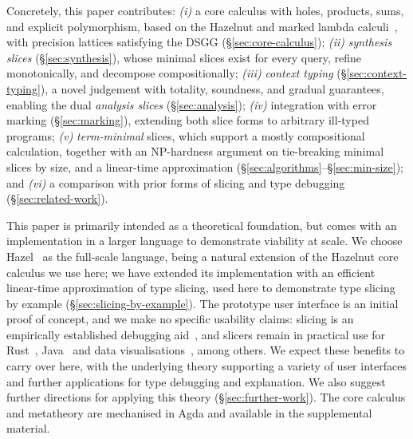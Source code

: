 Concretely, this paper contributes:
{\em (i)} a core calculus with holes, products, sums, and explicit polymorphism, based on the Hazelnut and marked lambda calculi~\cite{Hazelnut2017,Marking2024}, with precision lattices satisfying the DSGG (\S\ref{sec:core-calculus});
{\em (ii)} \textit{synthesis slices} (\S\ref{sec:synthesis}), whose minimal slices exist for every query, refine monotonically, and decompose compositionally;
{\em (iii)} \textit{context typing} (\S\ref{sec:context-typing}), a novel judgement with totality, soundness, and gradual guarantees, enabling the dual \textit{analysis slices} (\S\ref{sec:analysis});
{\em (iv)} integration with error marking (\S\ref{sec:marking}), extending both slice forms to arbitrary ill-typed programs;
{\em (v)} \textit{term-minimal} slices, which support a mostly compositional calculation, together with an NP-hardness argument on tie-breaking minimal slices by size, and a linear-time approximation (\S\ref{sec:algorithms}--\S\ref{sec:min-size});
and {\em (vi)} a comparison with prior forms of slicing and type debugging (\S\ref{sec:related-work}).

This paper is primarily intended as a theoretical foundation, but comes with an implementation in a larger language to demonstrate viability at scale. We choose Hazel~\cite{hazel-website} as the full-scale language, being a natural extension of the Hazelnut core calculus we use here; we have extended its implementation with an efficient linear-time approximation of type slicing, used here to demonstrate type slicing by example (\S\ref{sec:slicing-by-example}). The prototype user interface is an initial proof of concept, and we make no specific usability claims: slicing is an empirically established debugging aid~\cite{Weiser1982,BinkleyHarman2004,TypeSlicer2025}, and slicers remain in practical use for Rust~\cite{Flowistry}, Java~\cite{Slicer4J} and data visualisations~\cite{PereraVis2022}, among others. We expect these benefits to carry over here, with the underlying theory supporting a variety of user interfaces and further applications for type debugging and explanation. We also suggest further directions for applying this theory (\S\ref{sec:further-work}).
The core calculus and metatheory are mechanised in Agda and available in the supplemental material.

